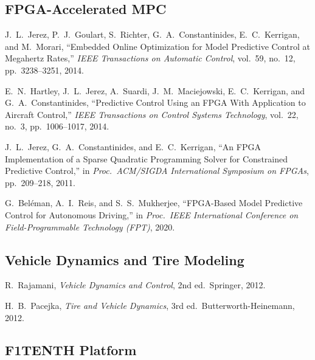 \documentclass[12pt,a4paper]{article}
\begin{document}
\subsection{FPGA-Accelerated MPC}

\begin{enumerate}[resume, label={[\arabic*]}]
    \item J.~L.~Jerez, P.~J.~Goulart, S.~Richter, G.~A.~Constantinides, E.~C.~Kerrigan, and M.~Morari, ``Embedded Online Optimization for Model Predictive Control at Megahertz Rates,'' \textit{IEEE Transactions on Automatic Control}, vol.~59, no.~12, pp.~3238--3251, 2014.

    \item E.~N.~Hartley, J.~L.~Jerez, A.~Suardi, J.~M.~Maciejowski, E.~C.~Kerrigan, and G.~A.~Constantinides, ``Predictive Control Using an FPGA With Application to Aircraft Control,'' \textit{IEEE Transactions on Control Systems Technology}, vol.~22, no.~3, pp.~1006--1017, 2014.

    \item J.~L.~Jerez, G.~A.~Constantinides, and E.~C.~Kerrigan, ``An FPGA Implementation of a Sparse Quadratic Programming Solver for Constrained Predictive Control,'' in \textit{Proc.\ ACM/SIGDA International Symposium on FPGAs}, pp.~209--218, 2011.

    \item G.~Bel\'eman, A.~I.~Reis, and S.~S.~Mukherjee, ``FPGA-Based Model Predictive Control for Autonomous Driving,'' in \textit{Proc.\ IEEE International Conference on Field-Programmable Technology (FPT)}, 2020.
\end{enumerate}

\subsection{Vehicle Dynamics and Tire Modeling}

\begin{enumerate}[resume, label={[\arabic*]}]
    \item R.~Rajamani, \textit{Vehicle Dynamics and Control}, 2nd ed.\ Springer, 2012.

    \item H.~B.~Pacejka, \textit{Tire and Vehicle Dynamics}, 3rd ed.\ Butterworth-Heinemann, 2012.
\end{enumerate}

\subsection{F1TENTH Platform}
\end{document}
